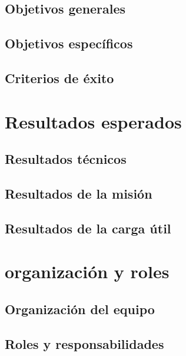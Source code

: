 \documentclass[letterpaper]{article} %
\begin{document}
    \subsection{Objetivos generales}

    \subsection{Objetivos específicos}
    
    \subsection{Criterios de éxito}

\section{Resultados esperados}

    \subsection{Resultados técnicos}

    \subsection{Resultados de la misión}

    \subsection{Resultados de la carga útil}

\section{organización y roles}

    \subsection{Organización del equipo}

    \subsection{Roles y responsabilidades}
\end{document}
